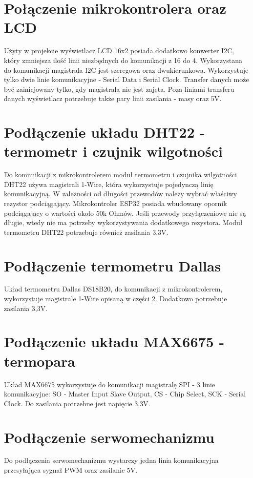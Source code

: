 \documentclass[11pt]{report}
\begin{document}
 \section{Połączenie mikrokontrolera oraz LCD}
 Użyty w projekcie wyświetlacz LCD 16x2 posiada dodatkowo konwerter I2C, który zmniejsza ilość linii niezbędnych do komunikacji z 16 do 4. Wykorzystana do komunikacji magistrala I2C jest szeregowa oraz dwukierunkowa. Wykorzystuje tylko dwie linie komunikacyjne - Serial Data i Serial Clock. Transfer danych może być zainicjowany tylko, gdy magistrala nie jest zajęta. Poza liniami transferu danych wyświetlacz potrzebuje także pary linii zasilania - masy oraz 5V.
  
 \section{Podłączenie układu DHT22 - termometr i czujnik wilgotności}\label{dht}
 Do komunikacji z mikrokontrolerem moduł termometru i czujnika wilgotności DHT22  używa magistrali 1-Wire, która wykorzystuje pojedynczą linię komunikacyjną. W zależności od długości przewodów należy wybrać właściwy rezystor podciągający.  Mikrokontroler ESP32 posiada wbudowany opornik podciągający o wartości około 50k Ohmów. Jeśli przewody przyłączeniowe nie są długie, wtedy nie ma potrzeby wykorzystywania dodatkowego rezystora.
 Moduł termometru DHT22 potrzebuje również zasilania 3,3V.
 
 \section{Podłączenie termometru Dallas}
 Układ termometru Dallas DS18B20, do komunikacji z mikrokontrolerem, wykorzystuje magistrale 1-Wire opisaną w części \ref{dht}. Dodatkowo potrzebuje zasilania 3,3V.
 
 \section{Podłączenie układu MAX6675 - termopara}
 Układ MAX6675 wykorzystuje do komunikacji magistralę SPI - 3 linie komunikacyjne: SO - Master Input Slave Output, CS - Chip Select, SCK - Serial Clock. Do zasilania potrzebne jest napięcie 3,3V.
 
 \section{Podłączenie serwomechanizmu}
 Do podłączenia serwomechanizmu wystarczy jedna linia komunikacyjna przesyłająca sygnał PWM oraz zasilanie 5V.
 
\end{document}
